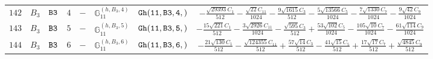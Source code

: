 \documentclass[fleqn,8pt]{jsarticle}
\begin{document}
\begin{table}[ht!]
\begin{center}
\begin{tabular}{cccccccc}
$ 142 $ & $ B_{3} $ & $ {\tt B3} $ & $ 4 $ & $ - $ & $ \mathbb{G}_{11}^{(h,B_{3},4)} $ & $ {\tt Gh(11,B3,4,)} $ & $ - \frac{\sqrt{29393} C_{1}}{512} - \frac{\sqrt{22} C_{11}}{1024} - \frac{9 \sqrt{1615} C_{3}}{512} - \frac{5 \sqrt{13566} C_{5}}{1024} - \frac{7 \sqrt{1330} C_{7}}{1024} - \frac{9 \sqrt{42} C_{9}}{1024} $ \\
$ 143 $ & $ B_{3} $ & $ {\tt B3} $ & $ 5 $ & $ - $ & $ \mathbb{G}_{11}^{(h,B_{3},5)} $ & $ {\tt Gh(11,B3,5,)} $ & $ - \frac{15 \sqrt{221} C_{1}}{512} - \frac{3 \sqrt{2926} C_{11}}{1024} - \frac{\sqrt{595} C_{3}}{512} + \frac{53 \sqrt{102} C_{5}}{1024} - \frac{105 \sqrt{10} C_{7}}{1024} - \frac{61 \sqrt{114} C_{9}}{1024} $ \\
$ 144 $ & $ B_{3} $ & $ {\tt B3} $ & $ 6 $ & $ - $ & $ \mathbb{G}_{11}^{(h,B_{3},6)} $ & $ {\tt Gh(11,B3,6,)} $ & $ - \frac{21 \sqrt{130} C_{1}}{512} - \frac{\sqrt{124355} C_{11}}{512} + \frac{57 \sqrt{14} C_{3}}{512} - \frac{41 \sqrt{15} C_{5}}{512} + \frac{17 \sqrt{17} C_{7}}{512} + \frac{\sqrt{4845} C_{9}}{512} $ \\
 \hline \hline
\end{tabular}
\end{center}
\end{table}
\end{document}
